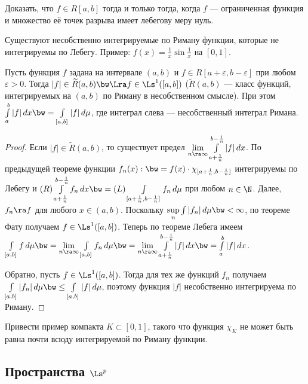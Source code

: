 \documentclass[10pt]{article}
\newcommand{\ve}{\varepsilon}
\begin{document}
\begin{problem}\label{zadacha}
Доказать, что $f\in R[a,b]$ тогда и только тогда, когда $f$ ---
ограниченная функция и множество её точек разрыва имеет лебегову
меру нуль.
\end{problem}

\begin{note}
Существуют несобственно интегрируемые по Риману функции, которые не
интегрируемы по Лебегу. Пример: $f(x)=\frac1x\sin\frac1x$ на
$[0,1]$.
\end{note}

\begin{theorem}
Пусть функция $f$ задана на интервале $(a,b)$ и $f\in
R[a+\ve,b-\ve]$ при любом $\ve>0$. Тогда $|f|\in\widetilde R(a,b)
\bw \Lra f\in \Ls^1([a,b])$ {\upshape($\widetilde R(a,b)$ --- класс
функций, интегрируемых на $(a,b)$ по Риману в несобственном
смысле)}. При этом $\int\limits_a^b|f|\,dx\bw
=\int\limits_{[a,b]}|f|\,d\mu$, где интеграл слева --- несобственный
интеграл Римана.
\end{theorem}

\begin{proof}
Если $|f|\in\widetilde R(a,b)$, то существует предел
$\lim\limits_{n\ra\infty}\int\limits_{a+\frac1n}^{b-\frac1n}|f|\,dx$.
По предыдущей теореме функции $f_n(x):\bw
=f(x)\cdot\chi_{[a+\frac1n,b-\frac1n]}$ интегрируемы по Лебегу и
$(R)\int\limits_{a+\frac1n}^{b-\frac1n}f_n\,dx\bw
=(L)\int\limits_{[a+\frac1n,b-\frac1n]}f_n\,d\mu$ при любом
$n\in\N$. Далее, $f_n\ra f$ для любого $x\in(a,b)$. Поскольку
$\sup\limits_n\int|f_n|\,d\mu \bw<\infty$, по теореме Фату получаем
$f\in \Ls^1([a,b])$. Теперь по теореме Лебега имеем
$\int\limits_{[a,b]} f\,d\mu\bw
=\lim\limits_{n\ra\infty}\int\limits_{[a,b]}f_n\,d\mu\bw
=\lim\limits_{n\ra\infty}\int\limits_{a+\frac1n}^{b-\frac1n}|f|\,dx\bw
=\int\limits_a^b|f|\,dx$.

Обратно, пусть $f\in \Ls^1([a,b])$. Тогда для тех же функций $f_n$
получаем $\int\limits_{[a,b]}|f_n|\,d\mu\bw
\le\int\limits_{[a,b]}|f|\,d\mu$, поэтому функция $|f|$ несобственно
интегрируема по Риману.
\end{proof}

\begin{problem}
Привести пример компакта $K\subset[0,1]$, такого что функция
$\chi_K$ не может быть равна почти всюду интегрируемой по Риману
функции.
\end{problem}


\subsection{Пространства $\Ls^p$}
\end{document}
